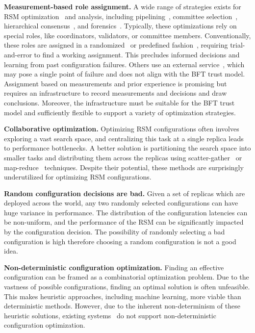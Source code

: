 \noindent\textbf{Measurement-based role assignment.}
A wide range of strategies exists for RSM optimization~\cite{berger2023sok} and analysis, including pipelining~\cite{rcc,sbft}, committee selection~\cite{dumbo,proteus,proof-of-qos}, hierarchical consensus~\cite{kauri, byzcoin}, and forensics~\cite{bft-forensics}.
Typically, these optimizations rely on special roles, like coordinators, validators, or committee members.
Conventionally, these roles are assigned in a randomized~\cite{algorand, kauri} or predefined fashion~\cite{zorfu, mirbft, mencius}, requiring trial-and-error to find a working assignment.
This precludes informed decisions and learning from past configuration failures.
Others use an external service~\cite{zookeeper, etcd, king}, which may pose a single point of failure and does not align with the BFT trust model.
Assignment based on measurements and prior experience is promising but requires an infrastructure to record measurements and decisions and draw conclusions.
Moreover, the infrastructure must be suitable for the BFT trust model and sufficiently flexible to support a variety of optimization strategies.

\noindent\textbf{Collaborative optimization.}
Optimizing RSM configurations often involves exploring a vast search space, and centralizing this task at a single replica leads to performance bottlenecks.
A better solution is partitioning the search space into smaller tasks and distributing them across the replicas using scatter-gather~\cite{mpi} or map-reduce~\cite{map-reduce, spark} techniques.
Despite their potential, these methods are surprisingly underutilized for optimizing RSM configurations.

\noindent\textbf{Random configuration decisions are bad.}
Given a set of replicas which are deployed across the world, any two randomly selected configurations can have huge variance in performance.
The distribution of the configuration latencies can be non-uniform, and the performance of the RSM can be significantly impacted by the configuration decision.
The possibility of randomly selecting a bad configuration is high therefore choosing a random configuration is not a good idea.




\noindent\textbf{Non-deterministic configuration optimization.}
Finding an effective configuration can be framed as a combinatorial optimization problem.
Due to the vastness of possible configurations, finding an optimal solution is often unfeasible.
This makes heuristic approaches, including machine learning, more viable than deterministic methods.
However, due to the inherent non-determinism of these heuristic solutions, existing systems~\cite{aware} do not support non-deterministic configuration optimization.





